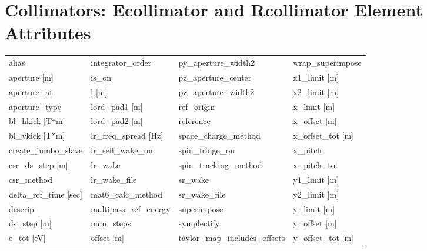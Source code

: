  \section{Collimators: Ecollimator and Rcollimator Element Attributes}
 \label{s:list.collimator}
 
 \begin{tabular}{llll} \toprule
alias                            & integrator_order                 & py_aperture_width2               & wrap_superimpose                 \\
aperture [m]                     & is_on                            & pz_aperture_center               & x1_limit [m]                     \\
aperture_at                      & l [m]                            & pz_aperture_width2               & x2_limit [m]                     \\
aperture_type                    & lord_pad1 [m]                    & ref_origin                       & x_limit [m]                      \\
bl_hkick [T*m]                   & lord_pad2 [m]                    & reference                        & x_offset [m]                     \\
bl_vkick [T*m]                   & lr_freq_spread [Hz]              & space_charge_method              & x_offset_tot [m]                 \\
create_jumbo_slave               & lr_self_wake_on                  & spin_fringe_on                   & x_pitch                          \\
csr_ds_step [m]                  & lr_wake                          & spin_tracking_method             & x_pitch_tot                      \\
csr_method                       & lr_wake_file                     & sr_wake                          & y1_limit [m]                     \\
delta_ref_time [sec]             & mat6_calc_method                 & sr_wake_file                     & y2_limit [m]                     \\
descrip                          & multipass_ref_energy             & superimpose                      & y_limit [m]                      \\
ds_step [m]                      & num_steps                        & symplectify                      & y_offset [m]                     \\
e_tot [eV]                       & offset [m]                       & taylor_map_includes_offsets      & y_offset_tot [m]                 \\

\end{tabular}
